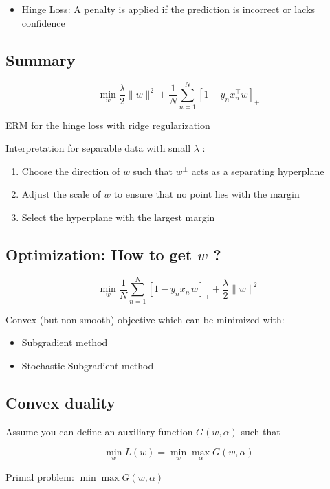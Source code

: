 \begin{itemize}
  \item Hinge Loss: A penalty is applied if the prediction is incorrect or lacks confidence
\end{itemize}

\subsection*{Summary}
$$
\min _{w} \frac{\lambda}{2}\|w\|^{2}+\frac{1}{N} \sum_{n=1}^{N}\left[1-y_{n} x_{n}^{\top} w\right]_{+}
$$

ERM for the hinge loss with ridge regularization


Interpretation for separable data with small $\lambda$ :

\begin{enumerate}
  \item Choose the direction of $w$ such that $w^{\perp}$ acts as a separating hyperplane

  \item Adjust the scale of $w$ to ensure that no point lies with the margin

  \item Select the hyperplane with the largest margin

\end{enumerate}


\subsection*{Optimization: How to get $w$ ?}
$$
\min _{w} \frac{1}{N} \sum_{n=1}^{N}\left[1-y_{n} x_{n}^{\top} w\right]_{+}+\frac{\lambda}{2}\|w\|^{2}
$$

Convex (but non-smooth) objective which can be minimized with:

\begin{itemize}
  \item Subgradient method
  \item Stochastic Subgradient method
\end{itemize}

\subsection*{Convex duality}
Assume you can define an auxiliary function $G(w, \alpha)$ such that

$$
\min _{w} L(w)=\min _{w} \max _{\alpha} G(w, \alpha)
$$

Primal problem: $\min \max G(w, \alpha)$

